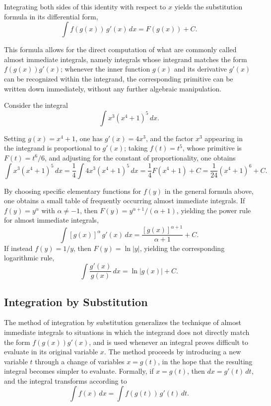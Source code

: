 Integrating both sides of this identity with respect to $x$ yields the substitution formula in its differential form,
\[
\int f(g(x)) \, g'(x) \, dx = F(g(x)) + C.
\]

This formula allows for the direct computation of what are commonly called almost immediate integrals, namely integrals whose integrand matches the form $f(g(x)) g'(x)$; whenever the inner function $g(x)$ and its derivative $g'(x)$ can be recognized within the integrand, the corresponding primitive can be written down immediately, without any further algebraic manipulation.

\begin{example}
Consider the integral
\[
\int x^3 (x^4+1)^5 \, dx.
\]

Setting $g(x) = x^4+1$, one has $g'(x) = 4x^3$, and the factor $x^3$ appearing in the integrand is proportional to $g'(x)$; taking $f(t) = t^5$, whose primitive is $F(t) = t^6/6$, and adjusting for the constant of proportionality, one obtains
\[
\int x^3 (x^4+1)^5 \, dx = \frac{1}{4} \int 4x^3 (x^4+1)^5 \, dx = \frac{1}{4} F(x^4+1) + C = \frac{1}{24} (x^4+1)^6 + C.
\]

\end{example}

By choosing specific elementary functions for $f(y)$ in the general formula above, one obtains a small table of frequently occurring almost immediate integrals. If $f(y) = y^\alpha$ with $\alpha \neq -1$, then $F(y) = y^{\alpha+1}/(\alpha+1)$, yielding the power rule for almost immediate integrals,
\[
\int [g(x)]^\alpha \, g'(x) \, dx = \frac{[g(x)]^{\alpha+1}}{\alpha+1} + C.
\]
If instead $f(y) = 1/y$, then $F(y) = \ln|y|$, yielding the corresponding logarithmic rule,
\[
\int \frac{g'(x)}{g(x)} \, dx = \ln|g(x)| + C.
\]

\subsection{Integration by Substitution}

The method of integration by substitution generalizes the technique of almost immediate integrals to situations in which the integrand does not directly match the form $f(g(x)) g'(x)$, and is used whenever an integral proves difficult to evaluate in its original variable $x$. The method proceeds by introducing a new variable $t$ through a change of variables $x = g(t)$, in the hope that the resulting integral becomes simpler to evaluate. Formally, if $x = g(t)$, then $dx = g'(t) \, dt$, and the integral transforms according to
\[
\int f(x) \, dx = \int f(g(t)) \, g'(t) \, dt.
\]

